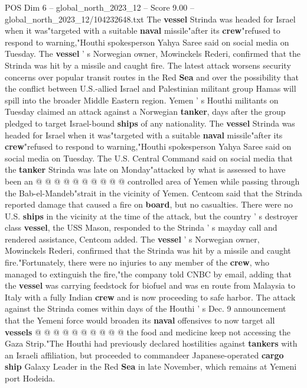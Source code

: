 \begin{textsample}{POS Dim 6 – global\_north\_2023\_12 – Score 9.00 – global\_north\_2023\_12/104232648.txt}  \label{ex:f6_pos_136}
The \textbf{vessel} Strinda was headed for Israel when it was"targeted with a suitable \textbf{naval} missile"after its \textbf{crew}"refused to respond to warning,"Houthi spokesperson Yahya Saree said on social media on Tuesday.
The \textbf{vessel} ' s Norwegian owner, Mowinckels Rederi, confirmed that the Strinda was hit by a missile and caught fire.
The latest attack worsens security concerns over popular transit routes in the Red \textbf{Sea} and over the possibility that the conflict between U.S.-allied Israel and Palestinian militant group Hamas will spill into the broader Middle Eastern region.
Yemen ' s Houthi militants on Tuesday claimed an attack against a Norwegian \textbf{tanker}, days after the group pledged to target Israel-bound \textbf{ships} of any nationality.
The \textbf{vessel} Strinda was headed for Israel when it was"targeted with a suitable \textbf{naval} missile"after its \textbf{crew}"refused to respond to warning,"Houthi spokesperson Yahya Saree said on social media on Tuesday.
The U.S.
Central Command said on social media that the \textbf{tanker} Strinda was late on Monday"attacked by what is assessed to have been an @ @ @ @ @ @ @ @ @ @ controlled area of Yemen while passing through the Bab-el-Mandeb"strait in the vicinity of Yemen.
Centcom said that the Strinda reported damage that caused a fire on \textbf{board}, but no casualties.
There were no U.S. \textbf{ships} in the vicinity at the time of the attack, but the country ' s destroyer class \textbf{vessel}, the USS Mason, responded to the Strinda ' s mayday call and rendered assistance, Centcom added.
The \textbf{vessel} ' s Norwegian owner, Mowinckels Rederi, confirmed that the Strinda was hit by a missile and caught fire."Fortunately, there were no injuries to any member of the \textbf{crew}, who managed to extinguish the fire,"the company told CNBC by email, adding that the \textbf{vessel} was carrying feedstock for biofuel and was en route from Malaysia to Italy with a fully Indian \textbf{crew} and is now proceeding to safe harbor.
The attack against the Strinda comes within days of the Houthi ' s Dec. 9 announcement that the Yemeni force would broaden its \textbf{naval} offensives to now target all \textbf{vessels} @ @ @ @ @ @ @ @ @ @ the food and medicine keep not accessing the Gaza Strip."The Houthi had previously declared hostilities against \textbf{tankers} with an Israeli affiliation, but proceeded to commandeer Japanese-operated \textbf{cargo} \textbf{ship} Galaxy Leader in the Red \textbf{Sea} in late November, which remains at Yemeni port Hodeida.

\end{textsample}
